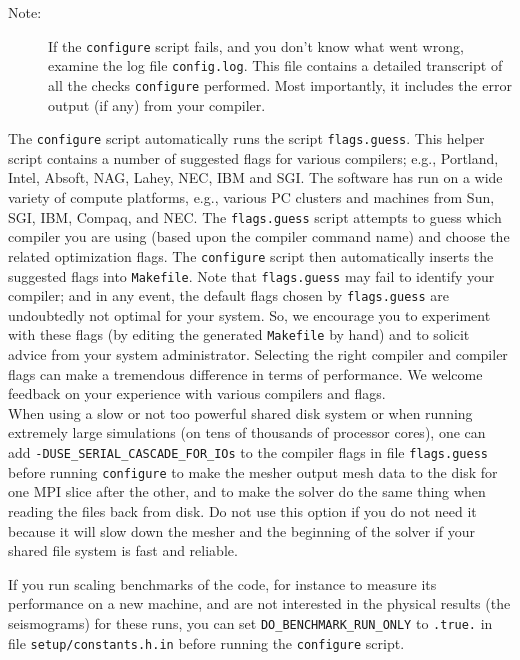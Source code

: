 \begin{description}
\item [{Note:}] If the \texttt{configure} script fails, and you don't know
what went wrong, examine the log file \texttt{config.log}. This file
contains a detailed transcript of all the checks \texttt{configure}
performed. Most importantly, it includes the error output (if any)
from your compiler.
\end{description}
The \texttt{configure} script automatically runs the script \texttt{flags.guess}.
This helper script contains a number of suggested flags for various
compilers; e.g., Portland, Intel, Absoft, NAG, Lahey, NEC, IBM and
SGI. The software has run on a wide variety of compute platforms,
e.g., various PC clusters and machines from Sun, SGI, IBM, Compaq,
and NEC. The \texttt{flags.guess} script attempts to guess which compiler
you are using (based upon the compiler command name) and choose the
related optimization flags. The \texttt{configure} script then automatically
inserts the suggested flags into \texttt{Makefile}. Note that \texttt{flags.guess}
may fail to identify your compiler; and in any event, the default
flags chosen by \texttt{flags.guess} are undoubtedly not optimal for
your system. So, we encourage you to experiment with these flags (by
editing the generated \texttt{Makefile} by hand) and to solicit advice
from your system administrator. Selecting the right compiler and compiler
flags can make a tremendous difference in terms of performance. We
welcome feedback on your experience with various compilers and flags.\\

When using a slow or not too powerful shared disk system or when running extremely large simulations
(on tens of thousands of processor cores), one can add \texttt{-DUSE\_SERIAL\_CASCADE\_FOR\_IOs} to the compiler flags
in file \texttt{flags.guess} before running \texttt{configure} to make the mesher output mesh data
to the disk for one MPI slice after the other, and to make the solver do the same thing when reading the files back from disk.
Do not use this option if you do not need it because it will slow down the mesher and the beginning of the solver if your
shared file system is fast and reliable.

If you run scaling benchmarks of the code, for instance to measure its performance on a new machine, and are not interested in the physical results
(the seismograms) for these runs, you can set \texttt{DO\_BENCHMARK\_RUN\_ONLY} to \texttt{.true.} in file \texttt{setup/constants.h.in} before running the \texttt{configure} script.

